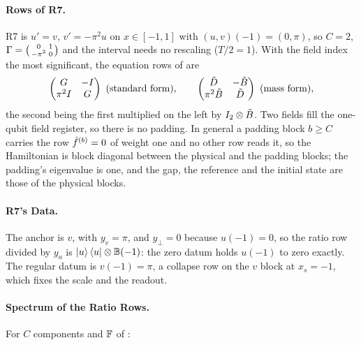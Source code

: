 \paragraph{Rows of R7.} R7 is $u'=v$, $v'=-\pi^2u$ on $x\in[-1,1]$ with $(u,v)(-1)=(0,\pi)$, so $C=2$, $\Gamma=\bigl(\begin{smallmatrix}0&1\\-\pi^2&0\end{smallmatrix}\bigr)$ and the interval needs no rescaling ($T/2=1$). With the field index the most significant, the equation rows of  are
\begin{equation}
    \begin{pmatrix}\G & -I\\ \pi^2 I & \G\end{pmatrix}\ \text{(standard form)},
    \qquad
    \begin{pmatrix}\Dt & -\Bt\\ \pi^2\Bt & \Dt\end{pmatrix}\ \text{(mass form)},
\end{equation}
the second being the first multiplied on the left by $I_2\otimes\tilde{B}$. Two fields fill the one-qubit field register, so there is no padding. In general a padding block $b\ge C$ carries the row $\hat{f}^{(b)}=0$ of weight one and no other row reads it, so the Hamiltonian is block diagonal between the physical and the padding blocks; the padding's eigenvalue is one, and the gap, the reference and the initial state are those of the physical blocks.

\paragraph{R7's Data.} The anchor is $v$, with $y_v=\pi$, and $y_\perp=0$ because $u(-1)=0$, so the ratio row divided by $y_a$ is $\ket{u}\bra{u}\otimes\mathbb{B}(-1)$: the zero datum holds $u(-1)$ to zero exactly. The regular datum is $v(-1)=\pi$, a collapse row on the $v$ block at $x_s=-1$, which fixes the scale and the readout.

\paragraph{Spectrum of the Ratio Rows.} For $C$ components and $\mathbb{F}$ of :


